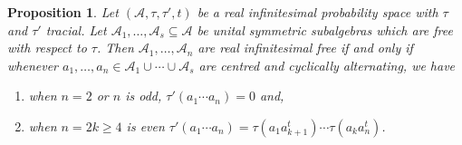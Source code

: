\documentclass[11pt]{amsart}
\newtheorem{proposition}[theorem]{Proposition}
\theoremstyle{definition}
\numberwithin{theorem}{section}
\newcommand{\cA}{\mathcal{A}}
\begin{document}
\begin{proposition}\label{prop:non-tracial case}
Let $(\cA, \tau, \tau', t)$ be a real infinitesimal
probability space with $\tau$ and $\tau'$ tracial. Let
$\cA_1, \dots, \cA_s \subseteq \cA$ be unital symmetric
subalgebras which are free with respect to $\tau$. Then
$\cA_1, \dots, \cA_n$ are real infinitesimal free if and
only if whenever $a_1, \dots, a_n \in \cA_1 \cup \cdots \cup
\cA_s$ are centred and cyclically alternating, we have

\begin{enumerate}

\item
when $n = 2$ or $n$ is odd, $\tau'(a_1  \cdots a_n) = 0$ and, \medskip

\item
when $n = 2 k \geq 4$ is even 
$\tau'(a_1 \cdots a_n) = \tau(a_1a_{k+1}^t) \cdots \tau(a_ka_n^t)$.
\end{enumerate}
\end{proposition}
\end{document}
